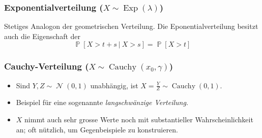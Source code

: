 \documentclass[a4paper,10pt]{article}
\renewcommand{\P}{\operatorname{\mathbb{P}}}
\DeclareMathOperator{\Exp}{Exp}
\DeclareMathOperator{\Cauchy}{Cauchy}
\DeclareMathOperator{\normal}{\mathcal{N}}
\numberwithin{equation}{section}
\begin{document}
\subsubsection{Exponentialverteilung (\( X \sim \Exp(\lambda) \))}
Stetiges Analogon der geometrischen Verteilung.
Die Eponentialverteilung besitzt auch die Eigenschaft der 
\[
    \P[X > t + s \: | \: X > s] = \P[X > t]
\]

\subsubsection{Cauchy-Verteilung (\( X \sim \Cauchy(x_0, \gamma) \))}
\begin{itemize}
    \item Sind \( Y, Z \sim \normal(0, 1) \) unabhängig, ist \( X = \frac{Y}{Z} \sim \Cauchy(0, 1) \).
    \item Beispiel für eine sogenannte \emph{langschwänzige Verteilung}.
    \item \( X \) nimmt auch sehr grosse Werte noch mit substantieller Wahrscheinlichkeit an; oft nützlich, um Gegenbeispiele zu konstruieren.
\end{itemize}
\end{document}
